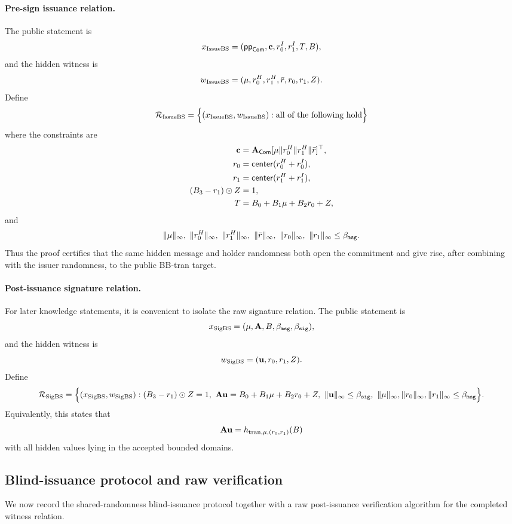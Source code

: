 \paragraph{Pre-sign issuance relation.}
The public statement is
\[
  x_{\mathrm{IssueBS}}=(\mathsf{pp}_{\mathsf{Com}},\mathbf{c},r_0^I,r_1^I,T,B),
\]
and the hidden witness is
\[
  w_{\mathrm{IssueBS}}=(\mathbf{\mu},r_0^H,r_1^H,\bar r,r_0,r_1,Z).
\]
Define
\[
  \mathcal R_{\mathrm{IssueBS}}
  =
  \Bigl\{(x_{\mathrm{IssueBS}},w_{\mathrm{IssueBS}}):
  \text{all of the following hold}\Bigr\}
\]
where the constraints are
\begin{align}
  \mathbf{c} &= \mathbf{A}_{\mathsf{Com}}[\mathbf{\mu}\Vert r_0^H\Vert r_1^H\Vert \bar r]^\top, \label{eq:issuebs-rel-commit}\\
  r_0 &= \mathsf{center}(r_0^H+r_0^I), \label{eq:issuebs-rel-center0}\\
  r_1 &= \mathsf{center}(r_1^H+r_1^I), \label{eq:issuebs-rel-center1}\\
  (B_3-r_1)\odot Z &= 1, \label{eq:issuebs-rel-inverse}\\
  T &= B_0+B_1\mathbf{\mu}+B_2r_0+Z, \label{eq:issuebs-rel-target}
\end{align}
and
\[
  \|\vecmu\|_\infty,\ \|r_0^H\|_\infty,\ \|r_1^H\|_\infty,\ \|\bar r\|_\infty,\ \|r_0\|_\infty,\ \|r_1\|_\infty
  \le \BoundMsg.
\]
Thus the proof certifies that the same hidden message and holder randomness both open the commitment and
give rise, after combining with the issuer randomness, to the public BB-tran target.

\paragraph{Post-issuance signature relation.}
For later knowledge statements, it is convenient to isolate the raw signature relation.  The public statement is
\[
  x_{\mathrm{SigBS}}=(\mathbf{\mu},\mathbf{A},B,\beta_{\mathtt{msg}},\beta_{\mathtt{sig}}),
\]
and the hidden witness is
\[
  w_{\mathrm{SigBS}}=(\mathbf{u},r_0,r_1,Z).
\]
Define
\[
  \mathcal R_{\mathrm{SigBS}}
  =
  \Bigl\{(x_{\mathrm{SigBS}},w_{\mathrm{SigBS}}):
  (B_3-r_1)\odot Z=1,
  \ \mathbf{A}\mathbf{u}=B_0+B_1\mathbf{\mu}+B_2r_0+Z,
  \ \|\mathbf{u}\|_\infty\le\beta_{\mathtt{sig}},
  \ \|\mathbf{\mu}\|_\infty,\|r_0\|_\infty,\|r_1\|_\infty\le\beta_{\mathtt{msg}}
  \Bigr\}.
\]
Equivalently, this states that
\[
  \mathbf{A}\mathbf{u}=h_{\mathrm{tran},\mathbf{\mu},(r_0,r_1)}(B)
\]
with all hidden values lying in the accepted bounded domains.

\subsection{Blind-issuance protocol and raw verification}
\label{subsec:bs-protocol}
We now record the shared-randomness blind-issuance protocol together with a raw post-issuance verification algorithm for the completed witness relation.

